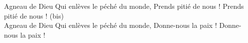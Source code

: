 Agneau de Dieu Qui enlèves le péché du monde, Prends pitié de nous !  Prends pitié de nous ! (bis) \\
Agneau de Dieu Qui enlèves le péché du monde, Donne-nous la paix !  Donne-nous la paix !
